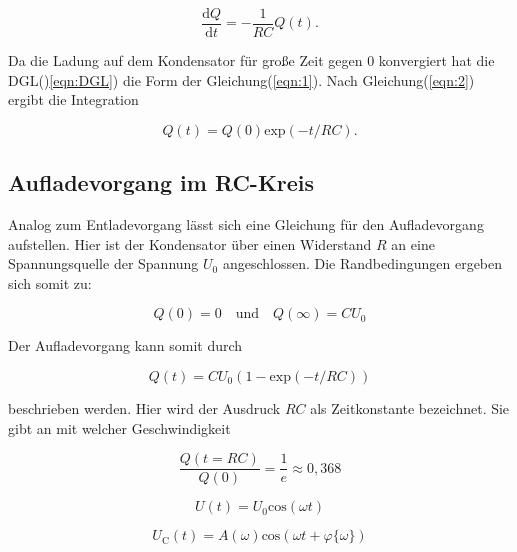         \begin{equation}
            \frac{\text{d}Q}{\text{d}t} = - \frac{1}{RC} Q(t).
            \label{eqn:DGL}
        \end{equation}

        \noindent Da die Ladung auf dem Kondensator für große Zeit gegen 0 konvergiert hat die DGL()\ref{eqn:DGL}) die Form der 
        Gleichung(\ref{eqn:1}). Nach Gleichung(\ref{eqn:2}) ergibt die Integration

        \begin{equation*}
            Q(t) = Q(0) \text{exp}(-t/RC).
        \end{equation*}

    \subsection{Aufladevorgang im RC-Kreis}

        \noindent Analog zum Entladevorgang lässt sich eine Gleichung für den Aufladevorgang aufstellen. Hier ist der Kondensator über einen 
        Widerstand $R$ an eine Spannungsquelle der Spannung $U_0$ angeschlossen. Die Randbedingungen ergeben sich somit zu:
    
        \begin{equation}
            Q(0) = 0 \quad \text{und} \quad Q(\infty) = CU_0 
        \end{equation}

        \noindent Der Aufladevorgang kann somit durch 

        \begin{equation}
            Q(t) = CU_0(1- \text{exp}(-t/RC))
        \end{equation}

        \noindent beschrieben werden. Hier wird der Ausdruck $RC$ als Zeitkonstante bezeichnet. Sie gibt an mit welcher Geschwindigkeit 

        \begin{equation}
            \frac{Q(t = RC)}{Q(0)} = \frac{1}{e} \approx 0,368
        \end{equation}

        \begin{equation}
            U(t) = U_0 \text{cos}( \omega t)
        \end{equation}

        \begin{equation}
            U_{\text{C}}(t) = A(\omega) \text{cos}(\omega t + \varphi \{ \omega \} )
        \end{equation}

